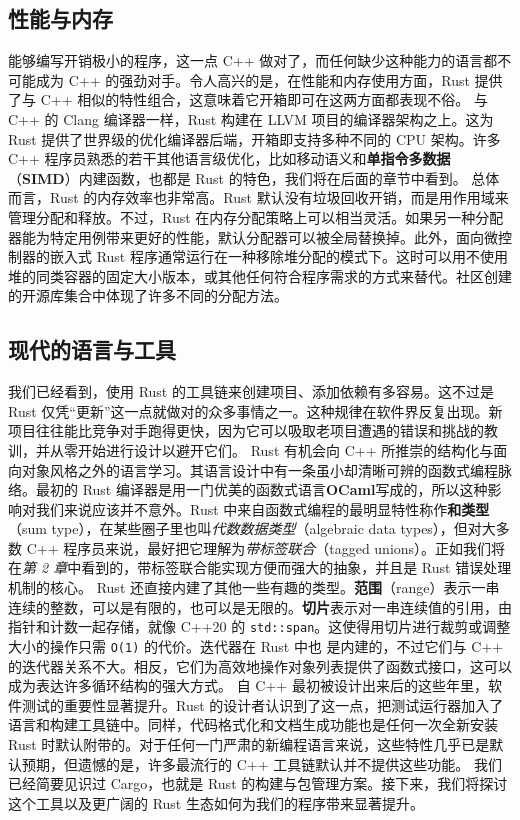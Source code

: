 \subsection{性能与内存}
\label{idx:idx_a1c5f2d1}
能够编写开销极小的程序，这一点 C++ 做对了，而任何缺少这种能力的语言都不可能成为 C++ 的强劲对手。令人高兴的是，在性能和内存使用方面，Rust 提供了与 C++ 相似的特性组合，这意味着它开箱即可在这两方面都表现不俗。
与 C++ 的 Clang 编译器一样，Rust 构建在 LLVM 项目的编译器架构之上。这为 Rust 提供了世界级的优化编译器后端，开箱即支持多种不同的 CPU 架构。许多 C++ 程序员熟悉的若干其他语言级优化，比如移动语义和\textbf{单指令多数据}（\textbf{SIMD}）内建函数，也都是 Rust 的特色，我们将在后面的章节中看到。
总体而言，Rust 的内存效率也非常高。Rust 默认没有垃圾回收开销，而是用作用域来管理分配和释放。不过，Rust 在内存分配策略上可以相当灵活。如果另一种分配器能为特定用例带来更好的性能，默认分配器可以被全局替换掉。此外，面向微控制器的嵌入式 Rust 程序通常运行在一种移除堆分配的模式下。这时可以用不使用堆的同类容器的固定大小版本，或其他任何符合程序需求的方式来替代。社区创建的开源库集合中体现了许多不同的分配方法。
\subsection{现代的语言与工具}
\label{idx:idx_ba50838d}
我们已经看到，使用 Rust 的工具链来创建项目、添加依赖有多容易。这不过是 Rust 仅凭“更新”这一点就做对的众多事情之一。这种规律在软件界反复出现。新项目往往能比竞争对手跑得更快，因为它可以吸取老项目遭遇的错误和挑战的教训，并从零开始进行设计以避开它们。
\label{idx:idx_010183fe}
\label{idx:idx_480d1e46}
Rust 有机会向 C++ 所推崇的结构化与面向对象风格之外的语言学习。其语言设计中有一条虽小却清晰可辨的函数式编程脉络。最初的 Rust 编译器是用一门优美的函数式语言\textbf{OCaml}写成的，所以这种影响对我们来说应该并不意外。Rust 中来自函数式编程的最明显特性称作\textbf{和类型}（sum type），在某些圈子里也叫\emph{代数数据类型}（algebraic data types），但对大多数 C++ 程序员来说，最好把它理解为\emph{带标签联合}（tagged unions）。正如我们将在\emph{第 2 章}中看到的，带标签联合能实现方便而强大的抽象，并且是 Rust 错误处理机制的核心。
\label{idx:idx_020dc836}
\label{idx:idx_b2e77528}
Rust 还直接内建了其他一些有趣的类型。\textbf{范围}（range）表示一串连续的整数，可以是有限的，也可以是无限的。\textbf{切片}表示对一串连续值的引用，由指针和计数一起存储，就像 C++20 的
\texttt{std::span}。这使得用切片进行裁剪或调整大小的操作只需 \texttt{O(1)} 的代价。迭代器在 Rust 中也
是内建的，不过它们与 C++ 的迭代器关系不大。相反，它们为高效地操作对象列表提供了函数式接口，这可以成为表达许多循环结构的强大方式。
自 C++ 最初被设计出来后的这些年里，软件测试的重要性显著提升。Rust 的设计者认识到了这一点，把测试运行器加入了语言和构建工具链中。同样，代码格式化和文档生成功能也是任何一次全新安装 Rust 时默认附带的。对于任何一门严肃的新编程语言来说，这些特性几乎已是默认预期，但遗憾的是，许多最流行的 C++ 工具链默认并不提供这些功能。
我们已经简要见识过 Cargo，也就是 Rust 的构建与包管理方案。接下来，我们将探讨这个工具以及更广阔的 Rust 生态如何为我们的程序带来显著提升。
